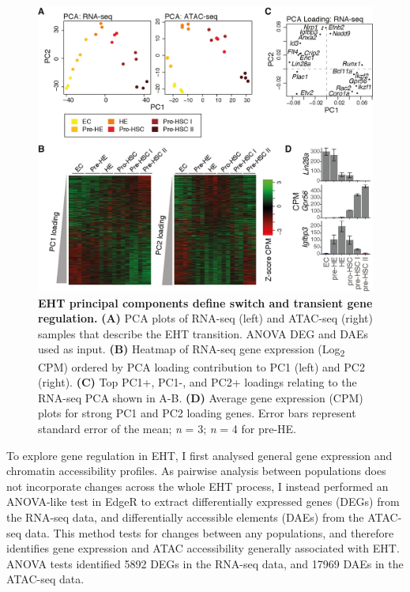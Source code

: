 \begin{figure}[!b]
    \centering
    \includegraphics[width=\textwidth,height=\textheight,keepaspectratio]{figures/chapter3/ch3_pca.png}
    \caption[{EHT principal components define switch and transient gene regulation.}]
    {\textbf{EHT principal components define switch and transient gene regulation.} 
    \textbf{(A)} PCA plots of RNA-seq (left) and ATAC-seq (right) samples that describe the EHT transition. ANOVA DEG and DAEs used as input. 
    \textbf{(B)} Heatmap of RNA-seq gene expression (Log\textsubscript{2} CPM) ordered by PCA loading contribution to PC1 (left) and PC2 (right).
    \textbf{(C)} Top PC1+, PC1-, and PC2+ loadings relating to the RNA-seq PCA shown in A-B.
    \textbf{(D)} Average gene expression (CPM) plots for strong PC1 and PC2 loading genes. Error bars represent standard error of the mean; \textit{n} = 3; \textit{n} = 4 for pre-HE.
    }
    \label{fig:ch3_pca}
\end{figure}

To explore gene regulation in EHT, I first analysed general gene expression and chromatin accessibility profiles. As pairwise analysis between populations does not incorporate changes across the whole EHT process, I instead performed an ANOVA-like test in EdgeR \citep{robinson_edger:_2010} to extract differentially expressed genes (DEGs) from the RNA-seq data, and differentially accessible elements (DAEs) from the ATAC-seq data. This method tests for changes between any populations, and therefore identifies gene expression and ATAC accessibility generally associated with EHT. ANOVA tests identified 5892 DEGs in the RNA-seq data, and 17969 DAEs in the ATAC-seq data. 

